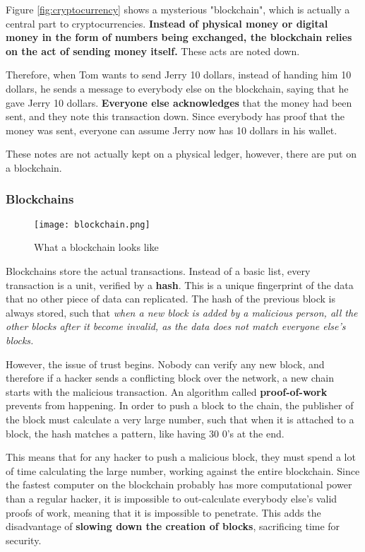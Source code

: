 \documentclass[../main.tex]{subfiles}
\begin{document}
Figure \ref{fig:cryptocurrency} shows a mysterious "blockchain", which is actually a central part to cryptocurrencies. \textbf{Instead of physical money or digital money in the form of numbers being exchanged, the blockchain relies on the act of sending money itself.} These acts are noted down.

Therefore, when Tom wants to send Jerry 10 dollars, instead of handing him 10 dollars, he sends a message to everybody else on the blockchain, saying that he gave Jerry 10 dollars. \textbf{Everyone else acknowledges} that the money had been sent, and they note this transaction down. Since everybody has proof that the money was sent, everyone can assume Jerry now has 10 dollars in his wallet.

These notes are not actually kept on a physical ledger, however, there are put on a blockchain.

\subsubsection{Blockchains}

\begin{figure}[H]
    \centering
    \texttt{[image: blockchain.png]}
    \caption{What a blockchain looks like}
    \label{fig:blockchain}
\end{figure}

Blockchains store the actual transactions. Instead of a basic list, every transaction is a unit, verified by a \textbf{hash}. This is a unique fingerprint of the data that no other piece of data can replicated. The hash of the previous block is always stored, such that \emph{when a new block is added by a malicious person, all the other blocks after it become invalid, as the data does not match everyone else's blocks.}

However, the issue of trust begins. Nobody can verify any new block, and therefore if a hacker sends a conflicting block over the network, a new chain starts with the malicious transaction. An algorithm called \textbf{proof-of-work} prevents from happening. In order to push a block to the chain, the publisher of the block must calculate a very large number, such that when it is attached to a block, the hash matches a pattern, like having 30 0's at the end.

This means that for any hacker to push a malicious block, they must spend a lot of time calculating the large number, working against the entire blockchain. Since the fastest computer on the blockchain probably has more computational power than a regular hacker, it is impossible to out-calculate everybody else's valid proofs of work, meaning that it is impossible to penetrate. This adds the disadvantage of \textbf{slowing down the creation of blocks}, sacrificing time for security.
\end{document}
